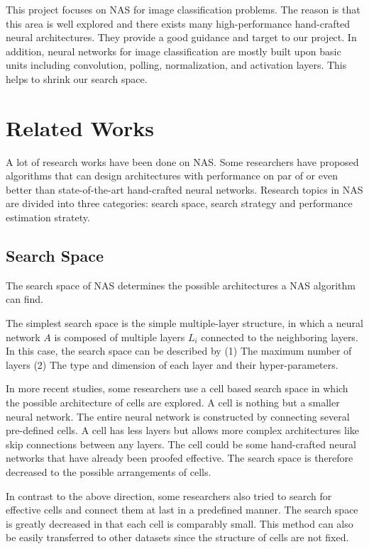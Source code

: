 \documentclass[conference]{IEEEtran}
\begin{document}
      This project focuses on NAS for image classification problems. The reason is that this area is well explored and there exists many high-performance hand-crafted neural architectures. They provide a good guidance and target to our project. In addition, neural networks for image classification are mostly built upon basic units including convolution, polling, normalization, and activation layers. This helps to shrink our search space.
    


    \section{Related Works}
    A lot of research works have been done on NAS. Some researchers have proposed algorithms that can design architectures with performance on par of or even better than state-of-the-art hand-crafted neural networks. Research topics in NAS are divided into three categories: search space, search strategy and performance estimation stratety.
    
    \subsection{Search Space}
    
    The search space of NAS determines the possible architectures a NAS algorithm can find.

    The simplest search space is the simple multiple-layer structure, in which a neural network $A$ is composed of multiple layers $L_i$ connected to the neighboring layers. In this case, the search space can be described by (1) The maximum number of layers (2) The type and dimension of each layer and their hyper-parameters\cite{chollet2017xception}\cite{baker2016designing}. 

    In more recent studies, some researchers use a cell based search space in which the possible architecture of cells are explored. A cell is nothing but a smaller neural network. The entire neural network is constructed by connecting several pre-defined cells. A cell has less layers but allows more complex architectures like skip connections between any layers\cite{cai2018path}\cite{real2018regularized}. The cell could be some hand-crafted neural networks that have already been proofed effective. The search space is therefore decreased to the possible arrangements of cells.

    In contrast to the above direction, some researchers also tried to search for effective cells and connect them at last in a predefined manner\cite{zoph2018learning}\cite{cai2018path}. The search space is greatly decreased in that each cell is comparably small. This method can also be easily transferred to other datasets\cite{zoph2018learning} since the structure of cells are not fixed.
\end{document}
